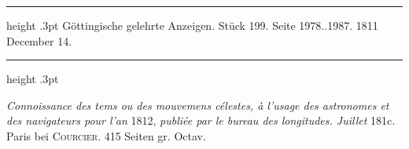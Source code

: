 \par\bigskip
\hypertarget{native-542-lower}{}\label{native-542-lower}
\begin{center}
\parbox{.9\linewidth}{%
\centering\small
\hrule height .3pt\relax\vspace{2.5pt}
Göttingische gelehrte Anzeigen. Stück 199. Seite 1978..1987. 1811 December 14.\par
\vspace{2.5pt}\hrule height .3pt\relax
}
\end{center}
\par\nobreak\medskip

\emph{Connoissance des tems ou des mouvemens célestes, à l'usage des astronomes et des navigateurs pour l'an} 1812, \emph{publiée par le bureau des longitudes. Juillet} 181c. Paris bei \textsc{Courcier}. 415 Seiten gr. Octav.

